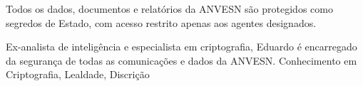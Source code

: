Todos os dados, documentos e relatórios da ANVESN são protegidos como segredos de Estado, com acesso restrito apenas aos agentes designados.

{Ex-analista de inteligência e especialista em criptografia, Eduardo é encarregado da segurança de todas as comunicações e dados da ANVESN.}
{Conhecimento em Criptografia, Lealdade, Discrição}

